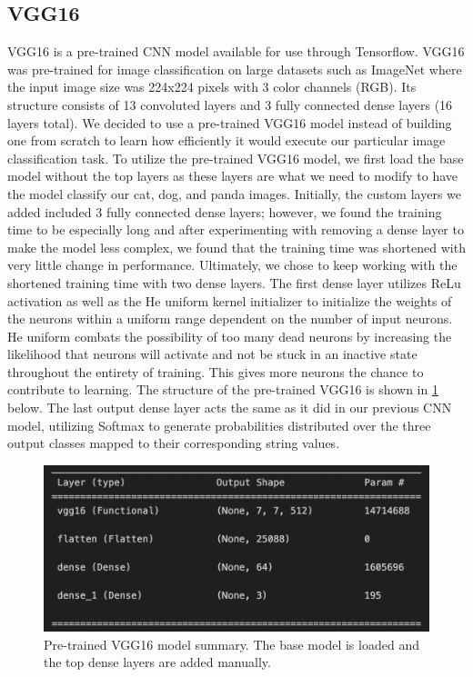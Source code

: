 \subsection{VGG16}
VGG16 is a pre-trained CNN model available for use through Tensorflow. VGG16 was pre-trained for image classification on large datasets such as ImageNet where the input image size was 224x224 pixels with 3 color channels (RGB). Its structure consists of 13 convoluted layers and 3 fully connected dense layers (16 layers total). We decided to use a pre-trained VGG16 model instead of building one from scratch to learn how efficiently it would execute our particular image classification task. 
To utilize the pre-trained VGG16 model, we first load the base model without the top layers as these layers are what we need to modify to have the model classify our cat, dog, and panda images. Initially, the custom layers we added included 3 fully connected dense layers; however, we found the training time to be especially long and after experimenting with removing a dense layer to make the model less complex, we found that the training time was shortened with very little change in performance. Ultimately, we chose to keep working with the shortened training time with two dense layers. The first dense layer utilizes ReLu activation as well as the He uniform kernel initializer to initialize the weights of the neurons within a uniform range dependent on the number of input neurons. He uniform combats the possibility of too many dead neurons by increasing the likelihood that neurons will activate and not be stuck in an inactive state throughout the entirety of training. This gives more neurons the chance to contribute to learning. The structure of the pre-trained VGG16 is shown in \ref{fig:figure2} below. The last output dense layer acts the same as it did in our previous CNN model, utilizing Softmax to generate probabilities distributed over the three output classes mapped to their corresponding string values. 

\begin{figure}[h]
	\centering
	\includegraphics[scale=0.5]{VGG16_structure}
	\caption{Pre-trained VGG16 model summary. The base model is loaded and the top dense layers are added manually.}
	\label{fig:figure2}
\end{figure}